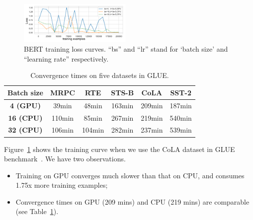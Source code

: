 \begin{figure}[!t]
\centering
\includegraphics[width=0.48\textwidth]{figures/bert_curve.pdf}
\vspace{-20pt}
\caption{\textcolor{check}{BERT training loss curves. ``bs'' and ``lr'' stand for `batch size' and  ``learning rate'' respectively.}}
\vspace{-5pt}
\label{fig:bert_motivation}
\end{figure}

\begin{table}[t]
\small
\caption{\textcolor{check}{Convergence times on five datasets in GLUE.}}
\vspace{-5pt}
\begin{tabular}{|c|c|c|c|c|c|}
\hline
\textbf{Batch size}      & \textbf{MRPC} & \textbf{RTE} & \textbf{STS-B} & \textbf{CoLA} & \textbf{SST-2} \\ \hline
\textbf{4  (GPU)}  & 39min         & 48min        & 163min         & 209min        & 187min         \\ \hline
\textbf{16 (CPU)} & 110min        & 85min        & 267min         & 219min        & 540min         \\ \hline
\textbf{32 (CPU)} & 106min        & 104min       & 282min         & 237min        & 539min         \\ \hline
\end{tabular}
\vspace{-5pt}
\label{tab:glue_bench}
\end{table}


\textcolor{check}{
Figure~\ref{fig:bert_motivation} shows the training curve when we use the CoLA dataset in GLUE benchmark~\cite{wang-etal-2018-glue}. We have two observations.}

\begin{itemize} %
    \item \textcolor{check}{Training on GPU converges much slower than that on CPU, and consumes 1.75x more training examples;}
    \item \textcolor{check}{Convergence times on GPU (209 mins) and CPU (219 mins) are comparable (see Table~\ref{tab:glue_bench})}. 
\end{itemize}

